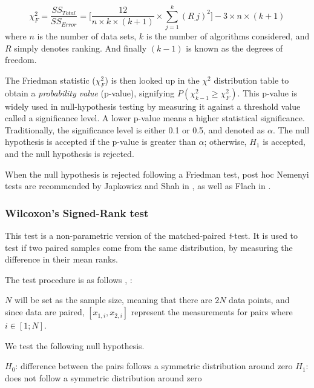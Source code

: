 \begin{equation}
\label{eq:friedman_statistic}
\chi^2_F = \frac{SS_{Total}}{SS_{Error}}=\bigg[\frac{12}{n\times k\times(k+1)}\times\sum_{j=1}^k(R_.j)^2\bigg]-3\times n \times (k+1)
\end{equation}where $n$ is the number of data sets, $k$ is the number of algorithms considered, and $R$ simply denotes ranking. And finally $(k-1)$ is known as the degrees of freedom.

The Friedman statistic ($\chi^2_F$) is then looked up in the $\chi^2$ distribution table to obtain a \textit{probability value} (p-value), signifying $P(\chi^2_{k-1} \geq \chi^2_F )$. This p-value is widely used in null-hypothesis testing by measuring it against a threshold value called a significance level. A lower p-value means a higher statistical significance. Traditionally, the significance level is either 0.1 or 0.5, and denoted as $\alpha$. The null hypothesis is accepted if the p-value is greater than $\alpha$; otherwise, $H_1$ is accepted, and the null hypothesis is rejected.

When the null hypothesis is rejected following a Friedman test, post hoc Nemenyi tests are recommended by Japkowicz and Shah in \cite{japkowicz2011evaluating}, as well as Flach in \cite[355]{flach2012ml}.

\subsubsection{Wilcoxon's Signed-Rank test}
This test is a non-parametric version of the matched-paired \textit{t}-test. It is used to test if two paired samples come from the same distribution, by measuring the difference in their mean ranks.

The test procedure is as follows \cite[233-235]{japkowicz2011evaluating}, \cite[354]{flach2012ml}:

$N$ will be set as the sample size, meaning that there are $2N$ data points, and since data are paired, $[x_{1, i}, x_{2, i}]$ represent the measurements for pairs where $i\in [1 ; N]$.

We test the following null hypothesis.

$H_0 $: difference between the pairs follows a symmetric distribution around zero
\newline$H_1$: does not follow a symmetric distribution around zero


